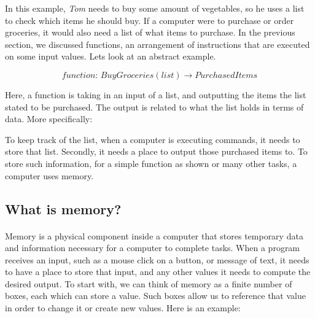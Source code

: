 In this example, \textit{Tom} needs to buy some amount of vegetables, so he uses a list to check which items he should buy. If a computer were to purchase or order groceries, it would also need a list of what items to purchase. In the previous section, we discussed functions, an arrangement of instructions that are executed on some input values. Lets look at an abstract example.

$$
function:\hspace{2pt} BuyGroceries(list) \rightarrow PurchasedItems
$$

Here, a function is taking in an input of a list, and outputting the items the list stated to be purchased. The output is related to what the list holds in terms of data. More specifically:

\begin{center}
\end{center}

To keep track of the list, when a computer is executing commands, it needs to store that list. Secondly, it needs a place to output those purchased items to. To store such information, for a simple function as shown or many other tasks, a computer uses memory.

\subsection{What is memory?}

\paragraph{   } Memory is a physical component inside a computer that stores temporary data and information necessary for a computer to complete tasks. When a program receives an input, such as a mouse click on a button, or message of text, it needs to have a place to store that input, and any other values it needs to compute the desired output. To start with, we can think of memory as a finite number of boxes, each which can store a value. Such boxes allow us to reference that value in order to change it or create new values. Here is an example: \\

